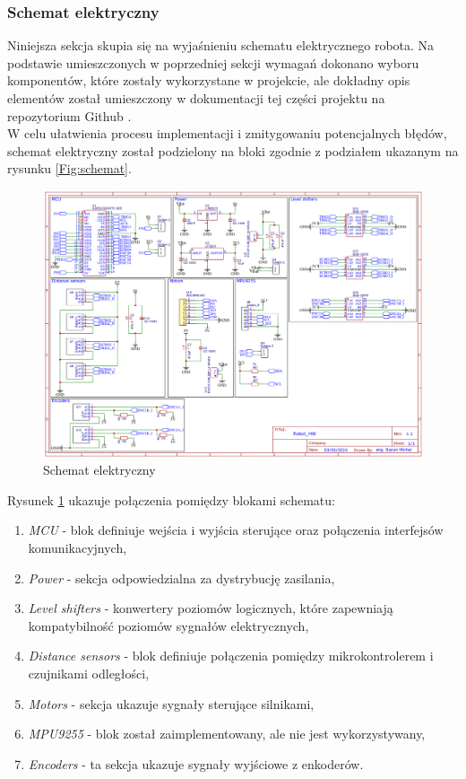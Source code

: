 \documentclass[12pt,twoside]{article}
\begin{document}
\newpage

\subsubsection{Schemat elektryczny}
Niniejsza sekcja skupia się na wyjaśnieniu schematu elektrycznego robota. 
Na podstawie umieszczonych w poprzedniej sekcji wymagań dokonano wyboru komponentów, które zostały wykorzystane w projekcie, ale dokładny opis elementów został umieszczony w dokumentacji tej części projektu na repozytorium Github \cite{repo}.\\
\newline
W celu ułatwienia procesu implementacji i zmitygowaniu potencjalnych błędów, schemat elektryczny został podzielony na bloki zgodnie z podziałem ukazanym na rysunku \ref{Fig:schemat}.



\begin{figure}[ht]%
 \centering%
 \includegraphics[width=12cm]{figures/engHW/robotschem.png}%
 \caption{Schemat elektryczny}%
 \label{Fig:elektryczny}%
\end{figure}

Rysunek \ref{Fig:elektryczny} ukazuje połączenia pomiędzy blokami schematu:

\begin{enumerate}[label=\alph*), leftmargin=1.25cm]
	\item \textit{MCU} - blok definiuje wejścia i wyjścia sterujące oraz połączenia interfejsów komunikacyjnych,
	\item \textit{Power} - sekcja odpowiedzialna za dystrybucję zasilania,
	\item \textit{Level shifters} - konwertery poziomów logicznych, które zapewniają kompatybilność poziomów sygnałów elektrycznych,
	\item \textit{Distance sensors} - blok definiuje połączenia pomiędzy mikrokontrolerem i czujnikami odległości,
	\item \textit{Motors} - sekcja ukazuje sygnały sterujące silnikami,
	\item \textit{MPU9255} - blok został zaimplementowany, ale nie jest wykorzystywany,
	\item \textit{Encoders} - ta sekcja ukazuje sygnały wyjściowe z enkoderów.
\end{enumerate}
\end{document}
